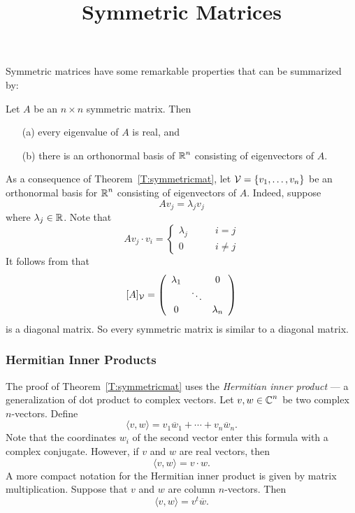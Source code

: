 \documentclass{ximera}
\title{Symmetric Matrices}
\begin{document}
\begin{abstract}
\end{abstract}
\maketitle


\label{S:symmetric}

Symmetric matrices have some remarkable properties that can be
summarized by:
\begin{thm}  \label{T:symmetricmat}
Let $A$ be an $n\times n$ symmetric matrix.
Then
\begin{enumerate}
\item[(a)] every eigenvalue
of $A$ is real, and
\item[(b)] there is an orthonormal basis
of $\mbox{$\Bbb{R}$}^n$ consisting of
	eigenvectors of $A$.
\end{enumerate}
\end{thm}

As a consequence of Theorem~\ref{T:symmetricmat}, let
${\cal V}=\{v_1,\ldots,v_n\}$ be an orthonormal basis for $\mbox{$\Bbb{R}$}^n$
consisting of eigenvectors of $A$.  Indeed, suppose
\[
Av_j = \lambda_jv_j
\]
where $\lambda_j\in\mbox{$\Bbb{R}$}$.  Note that
\[
Av_j\cdot v_i =  \left\{\begin{array}{rl} \lambda_j & \qquad i=j\\
			0 & \qquad i\neq j \end{array}\right.
\]
It follows from  that
\[
[A]_{\cal V}= \left(\begin{array}{ccc} \lambda_1 & & 0 \\  & \ddots & \\
	0 &  & \lambda_n \end{array}\right)
\]
is a diagonal matrix.  So every symmetric matrix is similar to a diagonal
matrix.

\subsubsection*{Hermitian Inner Products}

The proof of Theorem~\ref{T:symmetricmat} uses the {\em Hermitian inner
product} --- a generalization of
dot product to complex vectors.
Let $v,w\in\mbox{$\Bbb{C}$}^n$ be two complex $n$-vectors.  Define
\[
\langle v,w \rangle = v_1\overline{w}_1 + \cdots + v_n\overline{w}_n.
\]
Note that the coordinates $w_i$ of the second vector enter this formula
with a complex conjugate.  However, if $v$ and $w$ are real vectors, then
\[
\langle v,w \rangle = v\cdot w.
\]
A more compact notation for the Hermitian inner product is given by
matrix multiplication.
Suppose that $v$ and $w$ are column $n$-vectors.
Then
\[
\langle v,w \rangle = v^t\overline{w}.
\]
\end{document}
